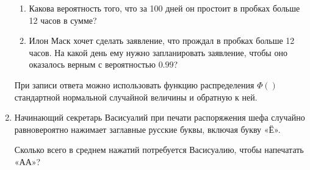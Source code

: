 \documentclass[12pt]{article}
\begin{document}
\begin{enumerate}
  \begin{enumerate}
    \item Какова вероятность того, что за 100 дней он простоит в пробках больше 12 часов в сумме?
    \item Илон Маск хочет сделать заявление, что прождал в пробках больше 12 часов. 
    На какой день ему нужно запланировать заявление, чтобы оно оказалось верным с вероятностью $0.99$?
  \end{enumerate}
  

  При записи ответа можно использовать функцию распределения $\Phi()$ стандартной нормальной случайной величины
  и обратную к ней. 




  

  \item Начинающий секретарь Васисуалий при печати распоряжения шефа случайно 
  равновероятно нажимает заглавные русские буквы, включая букву «Ё».
  
  Сколько всего в среднем нажатий потребуется Васисуалию, чтобы напечатать «АА»?
\end{enumerate}
\end{document}
